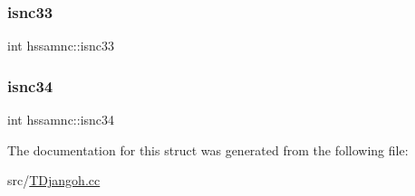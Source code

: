 \mbox{\label{structhssamnc_aefc6745cb5504af214fb2edbcf4f0303}} 
\subsubsection{\texorpdfstring{isnc33}{isnc33}}
{\footnotesize\ttfamily int hssamnc\+::isnc33}

\mbox{\label{structhssamnc_a9a62d0088d56b3118d6700b64544b53b}} 
\subsubsection{\texorpdfstring{isnc34}{isnc34}}
{\footnotesize\ttfamily int hssamnc\+::isnc34}



The documentation for this struct was generated from the following file\+:\begin{DoxyCompactItemize}
\item 
src/\hyperlink{_t_djangoh_8cc}{T\+Djangoh.\+cc}\end{DoxyCompactItemize}
